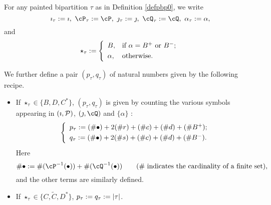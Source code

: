 \documentclass[counting_main.tex]{subfiles}
\begin{document}

For any painted bipartition $\tau$ as in Definition \ref{defpbp0}, we write
\[
  \imath_\tau:=\imath,\ \cP_\tau:=\cP,\  \jmath_\tau:=\jmath,\  \cQ_\tau:=\cQ,\ \alpha_\tau:=\alpha,
\]
and
\[
  \star_\tau:= \left\{
     \begin{array}{ll}
         B, &\hbox{if $\alpha=B^+$ or $B^-$}; \smallskip\\
            \alpha, & \hbox{otherwise}.           \end{array}
   \right.
  \]

We further define a pair $(p_{\tau}, q_{\tau})$  of natural numbers given by the following recipe.
 \begin{itemize}
  \item
  If $\star_\tau\in \{B, D, C^*\}$, $(p_\tau, q_\tau)$ is given by counting  the various symbols appearing in $(\imath, \mathcal{P})$, $(\jmath, \cQ)$ and $\{\alpha\}$ :
  \begin{equation}\label{ptqt}
  \left\{
     \begin{array}{l}
    p_\tau :=( \# \bullet)+ 2 (\# r) +(\# c )+ (\# d) + (\# B^+);\smallskip\\
    q_\tau :=( \# \bullet)+ 2 (\# s) + (\# c) + (\# d) + (\# B^-).\\
    \end{array}
    \right.
\end{equation}
Here
\[
\#\bullet:=\#(\cP^{-1}(\bullet))+\#(\cQ^{-1}(\bullet))\qquad (\textrm{$\#$ indicates the cardinality of a finite set}),
\]
and the other terms are similarly defined.
\item
If $\star_\tau\in \{C, \widetilde C, D^*\}$,  $p_\tau:=q_\tau:=\left|{\tau}\right|$.
\end{itemize}
\smallskip
\end{document}
